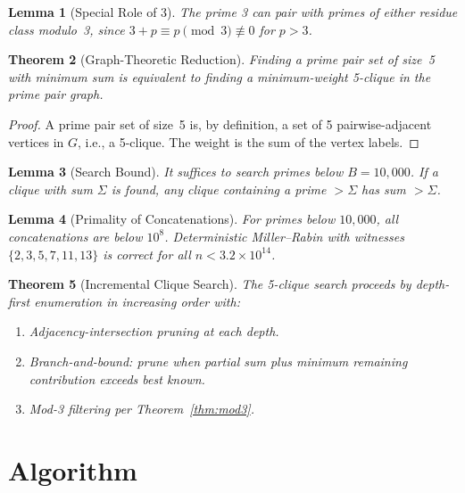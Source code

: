 \documentclass[12pt,a4paper]{article}
\newtheorem{theorem}{Theorem}
\newtheorem{lemma}[theorem]{Lemma}
\theoremstyle{definition}
\theoremstyle{remark}
\begin{document}
\begin{lemma}[Special Role of 3]
The prime 3 can pair with primes of either residue class modulo~3, since $3 + p \equiv p \pmod{3} \not\equiv 0$ for $p > 3$.
\end{lemma}

\begin{theorem}[Graph-Theoretic Reduction]
Finding a prime pair set of size~5 with minimum sum is equivalent to finding a minimum-weight 5-clique in the prime pair graph.
\end{theorem}

\begin{proof}
A prime pair set of size~5 is, by definition, a set of 5 pairwise-adjacent vertices in $G$, i.e., a 5-clique. The weight is the sum of the vertex labels.
\end{proof}

\begin{lemma}[Search Bound]
It suffices to search primes below $B = 10{,}000$. If a clique with sum $\Sigma$ is found, any clique containing a prime $> \Sigma$ has sum $> \Sigma$.
\end{lemma}

\begin{lemma}[Primality of Concatenations]
For primes below $10{,}000$, all concatenations are below $10^8$. Deterministic Miller--Rabin with witnesses $\{2, 3, 5, 7, 11, 13\}$ is correct for all $n < 3.2 \times 10^{14}$.
\end{lemma}

\begin{theorem}[Incremental Clique Search]
The 5-clique search proceeds by depth-first enumeration in increasing order with:
\begin{enumerate}
    \item Adjacency-intersection pruning at each depth.
    \item Branch-and-bound: prune when partial sum plus minimum remaining contribution exceeds best known.
    \item Mod-3 filtering per Theorem~\ref{thm:mod3}.
\end{enumerate}
\end{theorem}

\section{Algorithm}
\end{document}
